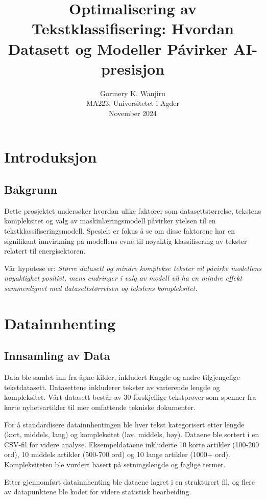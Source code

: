 \documentclass{article}
\title{Optimalisering av Tekstklassifisering: Hvordan Datasett og Modeller P\'avirker AI-presisjon}
\author{Gormery K. Wanjiru \\ MA223, Universitetet i Agder \\ November 2024}
\date{}
\begin{document}
\maketitle

\tableofcontents

\newpage

\section{Introduksjon}
\subsection{Bakgrunn}
Dette prosjektet undersøker hvordan ulike faktorer som datasettstørrelse, tekstens kompleksitet og valg av maskinlæringsmodell påvirker ytelsen til en tekstklassifiseringsmodell. Spesielt er fokus å se om disse faktorene har en signifikant innvirkning på modellens evne til nøyaktig klassifisering av tekster relatert til energisektoren.

Vår hypotese er: \textit{Større datasett og mindre komplekse tekster vil påvirke modellens nøyaktighet positivt, mens endringer i valg av modell vil ha en mindre effekt sammenlignet med datasettstørrelsen og tekstens kompleksitet.}

\section{Datainnhenting}
\subsection{Innsamling av Data}
Data ble samlet inn fra åpne kilder, inkludert Kaggle og andre tilgjengelige tekstdatasett. Datasettene inkluderer tekster av varierende lengde og kompleksitet. Vårt datasett består av 30 forskjellige tekstprøver som spenner fra korte nyhetsartikler til mer omfattende tekniske dokumenter.

For å standardisere datainnhentingen ble hver tekst kategorisert etter lengde (kort, middels, lang) og kompleksitet (lav, middels, høy). Dataene ble sortert i en CSV-fil for videre analyse. Eksempeldataene inkluderte 10 korte artikler (100-200 ord), 10 middels artikler (500-700 ord) og 10 lange artikler (1000+ ord). Kompleksiteten ble vurdert basert på setningslengde og faglige termer.

Etter gjennomført datainnhenting ble dataene lagret i en strukturert fil, og flere av datapunktene ble kodet for videre statistisk bearbeiding.
\end{document}
